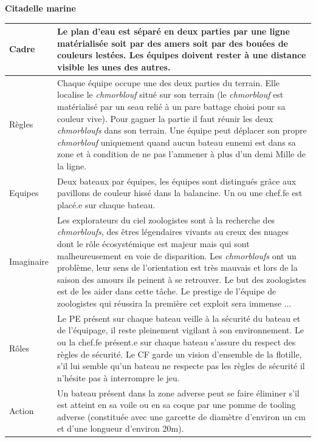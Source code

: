 
\begin{center}
{\huge \textbf{Citadelle marine}}\\ \vspace{0.5em}

\renewcommand{\arraystretch}{1.40}
\begin{tabular}{|C{5em}|C{40em}|}
\hline
Cadre  & Le plan d'eau est séparé en deux parties par une ligne matérialisée soit par des amers soit par des bouées de couleurs lestées. Les équipes doivent rester à une distance visible les unes des autres. \\
\hline
Règles  & Chaque équipe occupe une des deux parties du terrain. Elle localise le \textit{chmorblouf} situé sur son terrain (le \textit{chmorblouf} est matérialisé par un seau relié à un pare battage choisi pour sa couleur vive). Pour gagner la partie il faut réunir les deux \textit{chmorbloufs} dans son terrain. Une équipe peut déplacer son propre \textit{chmorblouf} uniquement quand aucun bateau ennemi est dans sa zone et à condition de ne pas l'ammener à plus d'un demi Mille de la ligne.
\\
\hline
Equipes & Deux bateaux par équipes, les équipes sont distingués grâce aux pavillons de couleur hissé dans la balancine. Un ou une chef.fe est placé.e sur chaque bateau. 
\\
\hline
Imaginaire & Les explorateurs du ciel zoologistes sont à la recherche des \textit{chmorbloufs}, des êtres légendaires vivants au creux des nuages dont le rôle écosystémique est majeur mais qui sont malheureusement en voie de disparition. Les \textit{chmorbloufs} ont un problème, leur sens de l'orientation est très mauvais et lors de la saison des amours ils peinent à se retrouver. Le but des zoologistes est de les aider dans cette tâche. Le prestige de l'équipe de zoologistes qui réussira la première cet exploit sera immense ... \\
\hline
Rôles & Le PE présent sur chaque bateau veille à la sécurité du bateau et de l'équipage, il reste pleinement vigilant à son environnement. 
Le ou la chef.fe présent.e sur chaque bateau s'assure du respect des règles de sécurité. 
Le CF garde un vision d'ensemble de la flotille, s'il lui semble qu'un bateau ne respecte pas les règles de sécurité il n'hésite pas à interrompre le jeu. \\
\hline
Action & Un bateau présent dans la zone adverse peut se faire éliminer s'il est atteint en sa voile ou en sa coque par une pomme de tooling adverse (constituée avec une garcette de diamètre d'environ un cm et d'une longueur d'environ 20m). 

\end{tabular}
\end{center}
